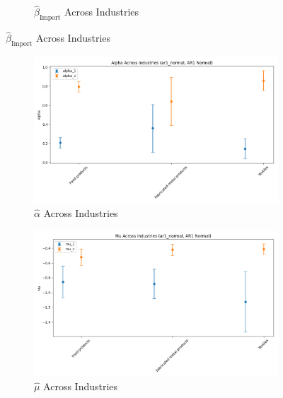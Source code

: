 \documentclass{article}
\begin{document}
\begin{figure}[ht!]
\begin{subfigure}[t]{0.32\textwidth}
        \caption{$\hat{\beta}_{\text{Import}}$ Across Industries}
    \end{subfigure}
\end{figure}


\begin{figure}[ht!]
    \centering 
    \caption{AR(1) Normal Model Across Industries}
    \begin{subfigure}[t]{0.32\textwidth}
        \centering
        \includegraphics[width=\textwidth]{figure/ar1_normal_alpha_across_industries.png}
        \caption{$\hat\alpha$ Across Industries}
    \end{subfigure}
    \begin{subfigure}[t]{0.32\textwidth}
        \centering
        \includegraphics[width=\textwidth]{figure/ar1_normal_mu_across_industries.png}
        \caption{$\hat\mu$ Across Industries}
    \end{subfigure}
    \begin{subfigure}[t]{0.32\textwidth}
        \centering

\end{subfigure}
\end{figure}
\end{document}
